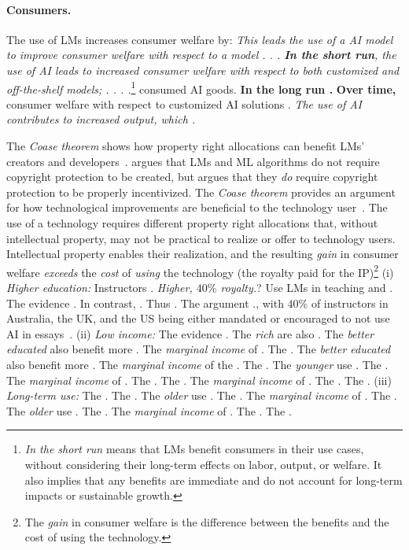 \documentclass{article} %
\begin{document}
\paragraph{Consumers.}
The use of LMs increases consumer welfare by: \emph{This leads the use of a \capname AI model to improve consumer welfare with respect to a \capname model . . . \textbf{In the short run}, the use of AI leads to increased consumer welfare with respect to both customized and off-the-shelf \capname models; . . . .}\footnote{\emph{In the short run} means that LMs benefit consumers in their use cases, without considering their long-term effects on labor, output, or welfare. It also implies that any benefits are immediate and do not account for long-term impacts or sustainable growth.} consumed AI goods. \textbf{In the long run .} \textbf{Over time,} consumer welfare with respect to customized AI solutions . \emph{The use of AI contributes to increased output, which .}

The \emph{Coase theorem} shows how property right allocations can benefit LMs' creators and developers~\citep{coase2013problem}.
\citet{lemley2020fair} argues that LMs and ML algorithms do not require copyright protection to be created, but \citet{lemley2020fair} argues that they \emph{do} require copyright protection to be properly incentivized.
The \emph{Coase theorem} provides an argument for how technological improvements are beneficial to the technology user~\citep{coase2013problem}.
The use of a technology requires different property right allocations that, without intellectual property, may not be practical to realize or offer to technology users.
Intellectual property enables their realization, and the resulting \emph{gain} in consumer welfare \emph{exceeds} the \emph{cost} of \emph{using} the technology (the royalty paid for the IP)\footnote{The \emph{gain} in consumer welfare is the difference between the benefits and the cost of using the technology.}  (i) \emph{Higher education:} Instructors . \emph{Higher, $40\%$ royalty.}? Use LMs in teaching and .  The evidence . In contrast, . Thus . The argument ., with $40\%$ of instructors in Australia, the UK, and the US being either mandated or encouraged to not use AI in essays~\citep{harvard2025chatgpt}. (ii) \emph{Low income:} The evidence . The \emph{rich} are also . The \emph{better educated} also benefit more . The \emph{marginal income} of . The . The \emph{better educated} also benefit more . The \emph{marginal income} of the . The . The \emph{younger} use . The . The \emph{marginal income} of . The . The . The \emph{marginal income} of . The . The . (iii) \emph{Long-term use:} The . The . The \emph{older} use . The . The \emph{marginal income} of . The . The \emph{older} use . The . The \emph{marginal income} of . The . The .
\end{document}
